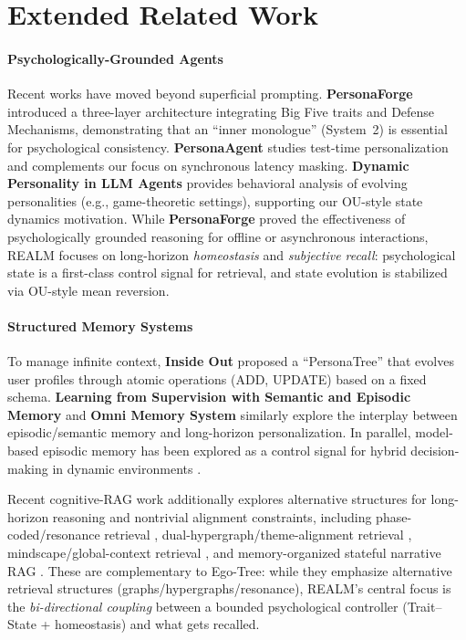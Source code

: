 \documentclass{article}
\begin{document}
\section{Extended Related Work}
\label{app:extended-related-work}

\paragraph{Psychologically-Grounded Agents}
Recent works have moved beyond superficial prompting. \textbf{PersonaForge} \cite{personaforge2026} introduced a three-layer architecture integrating Big Five traits and Defense Mechanisms, demonstrating that an ``inner monologue'' (System~2) is essential for psychological consistency. \textbf{PersonaAgent} \cite{zhang2025personaagent} studies test-time personalization and complements our focus on synchronous latency masking. \textbf{Dynamic Personality in LLM Agents} \cite{zeng2025dynamicpersonality} provides behavioral analysis of evolving personalities (e.g., game-theoretic settings), supporting our OU-style state dynamics motivation.
While \textbf{PersonaForge} proved the effectiveness of psychologically grounded reasoning for offline or asynchronous interactions, REALM focuses on long-horizon \emph{homeostasis} and \emph{subjective recall}: psychological state is a first-class control signal for retrieval, and state evolution is stabilized via OU-style mean reversion.

\paragraph{Structured Memory Systems}
To manage infinite context, \textbf{Inside Out} \cite{zhao2026inside} proposed a ``PersonaTree'' that evolves user profiles through atomic operations (ADD, UPDATE) based on a fixed schema. \textbf{Learning from Supervision with Semantic and Episodic Memory} \cite{hassell2025reflective} and \textbf{Omni Memory System} \cite{wang2025omnimemory} similarly explore the interplay between episodic/semantic memory and long-horizon personalization. In parallel, model-based episodic memory has been explored as a control signal for hybrid decision-making in dynamic environments \cite{le2021modelbasedepisodic}.

Recent cognitive-RAG work additionally explores alternative structures for long-horizon reasoning and nontrivial alignment constraints, including phase-coded/resonance retrieval \cite{saklakov2025phasecoded}, dual-hypergraph/theme-alignment retrieval \cite{hu2025cograg}, mindscape/global-context retrieval \cite{li2025mindscape}, and memory-organized stateful narrative RAG \cite{wang2025comorag}. These are complementary to Ego-Tree: while they emphasize alternative retrieval structures (graphs/hypergraphs/resonance), REALM's central focus is the \emph{bi-directional coupling} between a bounded psychological controller (Trait--State + homeostasis) and what gets recalled.
\end{document}
